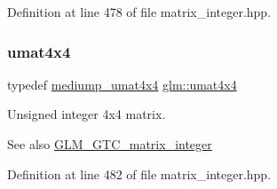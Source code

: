 Definition at line 478 of file matrix\+\_\+integer.\+hpp.

\mbox{\label{group__gtc__matrix__integer_gae0931b79e808fb0983848778a60eb548}} 
\subsubsection{\texorpdfstring{umat4x4}{umat4x4}}
{\footnotesize\ttfamily typedef \mbox{\hyperlink{group__gtc__matrix__integer_ga7141a9d9f1c26521e397be34d19c1b8f}{mediump\+\_\+umat4x4}} \mbox{\hyperlink{group__gtc__matrix__integer_gae0931b79e808fb0983848778a60eb548}{glm\+::umat4x4}}}

Unsigned integer 4x4 matrix. \begin{DoxySeeAlso}{See also}
\mbox{\hyperlink{group__gtc__matrix__integer}{G\+L\+M\+\_\+\+G\+T\+C\+\_\+matrix\+\_\+integer}} 
\end{DoxySeeAlso}


Definition at line 482 of file matrix\+\_\+integer.\+hpp.

